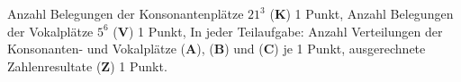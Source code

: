 \begin{bewertung}
Anzahl Belegungen der Konsonantenplätze $21^3$ ({\bf K}) 1 Punkt,
Anzahl Belegungen der Vokalplätze $5^6$ ({\bf V}) 1 Punkt,
In jeder Teilaufgabe: Anzahl Verteilungen der Konsonanten- und 
Vokalplätze ({\bf A}), ({\bf B}) und ({\bf C}) je 1 Punkt,
ausgerechnete Zahlenresultate ({\bf Z}) 1 Punkt.
\end{bewertung}
